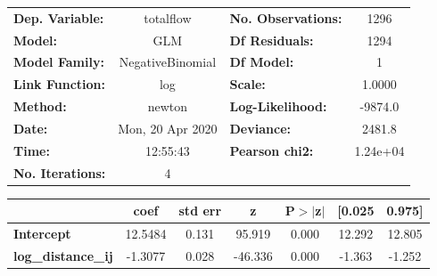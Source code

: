 \begin{center}
\begin{tabular}{lclc}
\toprule
\textbf{Dep. Variable:}    &    totalflow     & \textbf{  No. Observations:  } &     1296    \\
\textbf{Model:}            &       GLM        & \textbf{  Df Residuals:      } &     1294    \\
\textbf{Model Family:}     & NegativeBinomial & \textbf{  Df Model:          } &        1    \\
\textbf{Link Function:}    &       log        & \textbf{  Scale:             } &    1.0000   \\
\textbf{Method:}           &      newton      & \textbf{  Log-Likelihood:    } &   -9874.0   \\
\textbf{Date:}             & Mon, 20 Apr 2020 & \textbf{  Deviance:          } &    2481.8   \\
\textbf{Time:}             &     12:55:43     & \textbf{  Pearson chi2:      } &  1.24e+04   \\
\textbf{No. Iterations:}   &        4         & \textbf{                     } &             \\
\bottomrule
\end{tabular}
\begin{tabular}{lcccccc}
                           & \textbf{coef} & \textbf{std err} & \textbf{z} & \textbf{P$> |$z$|$} & \textbf{[0.025} & \textbf{0.975]}  \\
\midrule
\textbf{Intercept}         &      12.5484  &        0.131     &    95.919  &         0.000        &       12.292    &       12.805     \\
\textbf{log\_distance\_ij} &      -1.3077  &        0.028     &   -46.336  &         0.000        &       -1.363    &       -1.252     \\
\bottomrule
\end{tabular}
\end{center}